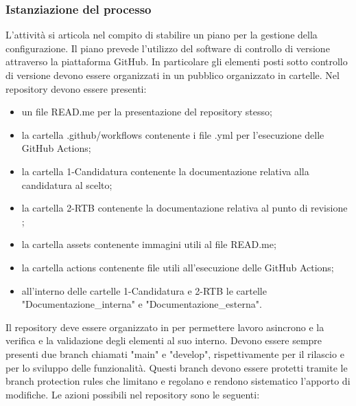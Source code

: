 \subsubsection{Istanziazione del processo}
L'attività si articola nel compito di stabilire un piano per la gestione della configurazione. Il piano prevede l'utilizzo del software di controllo di versione  attraverso la piattaforma GitHub. In particolare gli elementi posti sotto controllo di versione devono essere organizzati in un  pubblico organizzato in cartelle. Nel repository devono essere presenti: 
\begin{itemize}
    \item un file READ.me per la presentazione del repository stesso;
    \item la cartella .github/workflows contenente i file .yml per l'esecuzione delle GitHub Actions;
    \item la cartella 1-Candidatura contenente la documentazione relativa alla candidatura al  scelto;
    \item la cartella 2-RTB contenente la documentazione relativa al punto di revisione  ;
    \item la cartella assets contenente immagini utili al file READ.me;
    \item la cartella actions contenente file utili all'esecuzione delle GitHub Actions;
    \item all'interno delle cartelle 1-Candidatura e 2-RTB le cartelle "Documentazione\_interna" e "Documentazione\_esterna".
\end{itemize}
Il repository deve essere organizzato in  per permettere lavoro asincrono e la verifica e la validazione degli elementi al suo interno. Devono essere sempre presenti due branch chiamati "main" e "develop", rispettivamente per il rilascio e per lo sviluppo delle funzionalità. Questi branch devono essere protetti tramite le branch protection rules che limitano e regolano e rendono sistematico l'apporto di modifiche.
Le azioni possibili nel repository sono le seguenti:
